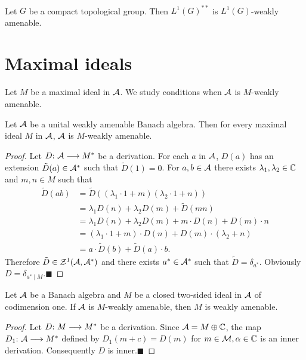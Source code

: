 \documentclass[fleqn]{mat01}
\begin{document}
\begin{coro}$\left.\right.$\vspace{.5pc}

\noindent Let $G$ be a compact topological group. Then $L^1(G)^{**}$ is
$L^1(G)$-weakly amenable.
\end{coro}

\section{Maximal ideals}

Let $M$ be a maximal ideal in $\cal A$. We study conditions when
$\cal A$ is $M$-weakly amenable.

\setcounter{theo}{0}
\begin{theor}[\!]
Let $\cal A$ be a unital weakly amenable Banach algebra. Then for every
maximal ideal $ M$ in $\cal A${\rm ,} $\cal A$ is $ M$-weakly amenable.
\end{theor}

\begin{proof}
Let $D\hbox{:}\ {\cal A}\longrightarrow { M}^*$ be a derivation. For
each $a$ in $\cal A$, $D(a)$ has an extension $\tilde{D}(a)\in \cal
A^*$ such that $\tilde{D}(1)=0$. For $ a,b \in \cal A$
there exists $\lambda_1 , \lambda_2 \in \Bbb{C}$ and $m,n \in M$ such
that
\begin{align*}
\tilde{{D}}(ab) &= \tilde {D}((\lambda_1\cdot 1+m)(\lambda_2\cdot 1+n))\\[.2pc]
&= \lambda_1 {D}(n)+\lambda_2 {D}(m) +\tilde {D}(mn)\\[.2pc]
&= \lambda_1 {D}(n)+\lambda_2 {D}(m) +m\cdot {D}(n)+
{D}(m)\cdot n\\[.2pc]
&= (\lambda_1\cdot 1+m)\cdot {D}(n)+{D}(m)\cdot(\lambda_2+n)\\[.2pc]
&= a\cdot\tilde {D}(b)+\tilde {D}(a)\cdot b.
\end{align*}
Therefore ${\tilde D}\in {\cal Z}^1 ({\cal A},{\cal A}^*)$ and there
exists $a^*\in {\cal A}^*$ such that ${\tilde D}={\delta}_{a^*}$.
Obviously ${D}=\delta_{a^*\mid M}$.\hfill $\blacksquare$
\end{proof}

\begin{theor}[\!]
Let $\cal A$ be a Banach algebra and $M$ be a closed two-sided ideal in
$\cal A$ of codimension one. If $\cal A$ is $M$-weakly amenable{\rm ,}
then $M$ is weakly amenable.
\end{theor}

\begin{proof}
Let ${D}\hbox{:}\ M\longrightarrow M^*$ be a derivation. Since ${\cal
A}=M\oplus \Bbb C$, the map ${D}_1\hbox{:}\ {\cal A}\longrightarrow M^*$
defined by ${ D}_1(m+c)={ D}(m)$ for $m\in {\cal M}, \alpha \in \Bbb C$
is an inner derivation. Consequently ${D}$ is inner.\hfill $\blacksquare$
\end{proof}
\end{document}
